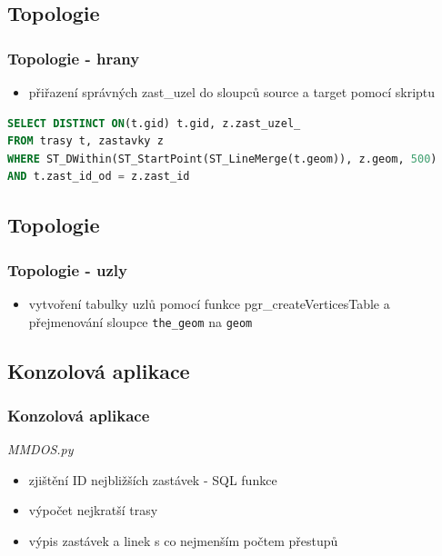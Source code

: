 \documentclass{beamer}
\begin{document}
\begin{frame}[fragile]
\section{Topologie}
\frametitle{Topologie - hrany}	
\begin{itemize}
	\item přiřazení správných zast\_uzel do sloupců source a target pomocí skriptu
\end{itemize}
\begin{exampleblock}{}
\begin{lstlisting}[language=sql]
SELECT DISTINCT ON(t.gid) t.gid, z.zast_uzel_ 
FROM trasy t, zastavky z 
WHERE ST_DWithin(ST_StartPoint(ST_LineMerge(t.geom)), z.geom, 500) 
AND t.zast_id_od = z.zast_id
\end{lstlisting}
\end{exampleblock}

\end{frame}

\begin{frame}
\section{Topologie}
\frametitle{Topologie - uzly}	

\begin{itemize}
	\item vytvoření tabulky uzlů pomocí funkce pgr\_createVerticesTable a přejmenování sloupce \texttt{the\_geom} na \texttt{geom}
\end{itemize}

\end{frame}

\begin{frame}
\section{Konzolová aplikace}
\frametitle{Konzolová aplikace}
\begin{block}{}
\indent \textit{MMDOS.py}
\end{block}
\begin{itemize}
	\item zjištění ID nejbližších zastávek - SQL funkce
	\item výpočet nejkratší trasy
	\item výpis zastávek a linek s co nejmenším počtem přestupů
\end{itemize}
\end{frame}
\end{document}
